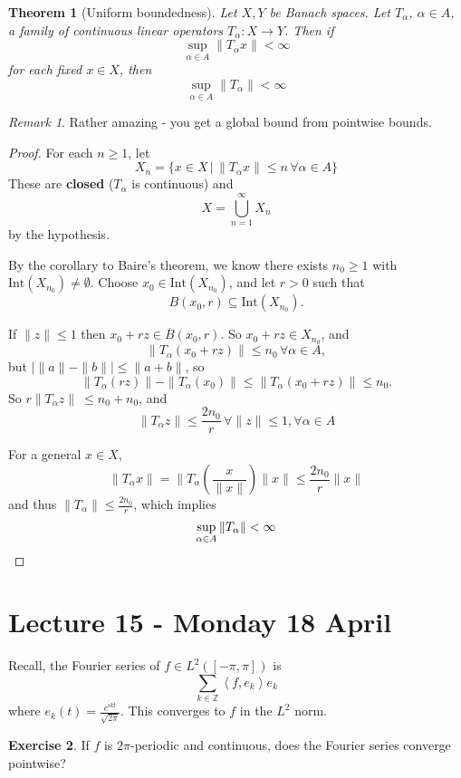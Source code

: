 \documentclass[10pt, reqno, oneside]{amsart}
\theoremstyle{plain}%
\newtheorem{thm}{Theorem}[section]
\theoremstyle{definition}
\newtheorem{exer}[thm]{Exercise}
\theoremstyle{remark}
\newtheorem*{rem}{Remark}
\newcommand{\given}{ \, | \,}
\newcommand{\Z}{\mathbb{Z}}
\newcommand{\iprod}[1]{\left\langle #1 \right\rangle}
\begin{document}
\begin{thm}[Uniform boundedness]
	Let $X, Y$ be Banach spaces.  Let $T_\alpha$, $\alpha \in A$, a family of continuous linear operators $T_\alpha : X \rightarrow Y$.  Then if \[
		\sup_{\alpha \in A} \| T_\alpha x \| < \infty
	\] for each fixed $x \in X$, then \[
		\sup_{\alpha \in A} \| T_\alpha \| < \infty
	\]
\end{thm}
\begin{rem}
	Rather amazing - you get a global bound from pointwise bounds.
\end{rem}
\begin{proof}
	For each $n \geq 1$, let \[
		X_n = \{ x \in X \given \| T_\alpha x \| \leq n \, \forall \alpha \in A \}
	\]  These are \textbf{closed} ($T_{\alpha}$ is continuous) and \[
		X = \bigcup_{n=1}^\infty X_n
	\] by the hypothesis.
	
	By the corollary to Baire's theorem, we know there exists $n_0 \geq 1$ with $\text{Int}(X_{n_0}) \neq \emptyset$.  Choose $x_0 \in \text{Int}(X_{n_0})$, and let $r > 0$ such that \[
		B(x_0, r) \subseteq \text{Int}(X_{n_0}).  
	\]  
	
	If $\| z \| \leq 1$ then $x_0 + rz \in \overline B (x_0, r)$. So $x_0 + rz \in X_{n_0}$, and \[
		\| T_\alpha(x_0 + rz) \| \leq n_0 \, \forall \alpha \in A,
	\]  but $| \| a \| - \| b \| | \leq \| a + b \|$, so \[
		\| T_\alpha (rz) \| - \| T_\alpha (x_0) \| \leq \| T_\alpha (x_0 + rz) \| \leq n_0.
	\]
	So $r \| T_\alpha z \| \ \leq n_0 + n_0$, and \[
		\| T_\alpha z \| \leq \frac{2 n_0}{r} \, \forall \| z \| \leq 1, \forall \alpha \in A
	\]
	
	For a general $x \in X$, \[
		\| T_\alpha x \| = \| T_\alpha ( \frac{x}{\| x \|}) \| x \| \leq \frac{2 n_0}{r} \| x \|
	\] and thus $\|T_\alpha \| \leq \frac{2 n_0}{r}$, which implies \[
		\sup_{\alpha \in A} \| T_\alpha \| < \infty \qedhere
	\]
	
	
\end{proof}

\section{Lecture 15 - Monday 18 April} %
\label{sec:lecture_15_monday_18_april}
Recall, the Fourier series of $f \in L^2([-\pi, \pi])$ is \[
	\sum_{k \in \Z} \iprod{f, e_k} e_k
\] where $e_k(t) = \frac{e^{ikt}}{\sqrt{2 \pi}}$.  This converges to $f$ in the $L^2$ norm.

\begin{exer}
	If $f$ is $2\pi$-periodic and continuous, does the Fourier series converge pointwise?  
\end{exer}
\end{document}

